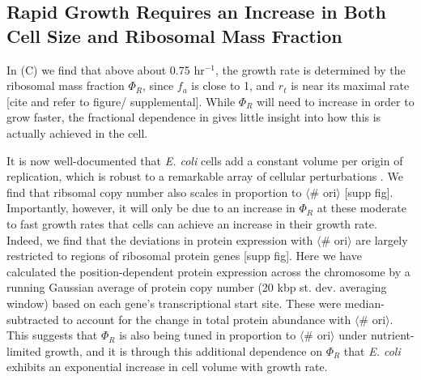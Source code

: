 \subsection{Rapid Growth Requires an Increase in Both Cell Size and Ribosomal
Mass Fraction}
In (C) we find that above about 0.75 hr$^{-1}$, the growth
rate is determined by the ribosomal mass fraction $\Phi_R$, since $f_a$ is close
to 1, and $r_t$ is near its maximal rate [cite and refer to figure/
supplemental]. While $\Phi_R$ will need to increase in order to grow faster, the
fractional dependence in  gives little insight
into how this is actually achieved in the cell.

It is now well-documented that \textit{E. coli} cells add a constant volume per
origin of replication, which is robust to a remarkable array of cellular
perturbations \citep{si2017}. We find that ribsomal copy number also scales in
proportion to $\langle$\# ori$\rangle$ [supp fig]. Importantly, however, it will
only be due to an increase in $\Phi_R$ at these moderate to fast growth rates
that cells can achieve an increase in their growth rate. Indeed, we find that
the deviations in protein expression with $\langle$\# ori$\rangle$ are largely
restricted to regions of ribosomal protein genes [supp fig]. Here we have calculated
the position-dependent protein expression across the chromosome by a running
Gaussian average of protein copy number (20 kbp st. dev. averaging window) based
on each gene's transcriptional start site. These were median-subtracted to
account for the change in total protein abundance with $\langle$\# ori$\rangle$.
This suggests that $\Phi_R$ is also being tuned in proportion to $\langle$\#
ori$\rangle$ under nutrient-limited growth, and it is through this additional
dependence on $\Phi_R$ that \textit{E. coli} exhibits an exponential increase in
cell volume with growth rate.




%
%
%
%
%



